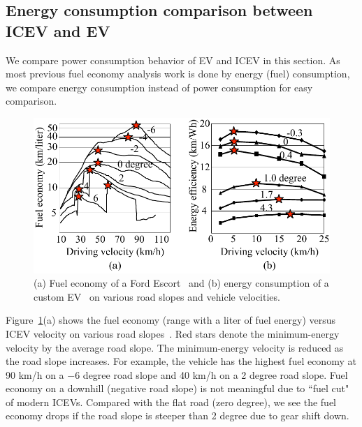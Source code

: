 \documentclass{IEEEtran}
\begin{document}
\subsection{Energy consumption comparison between ICEV and EV} \label{subsec:comparison}

We compare power consumption behavior of EV and ICEV in this section. As most previous fuel economy analysis work is done by energy (fuel) consumption, we compare energy consumption instead of power consumption for easy comparison. 

\begin{figure}	%
\includegraphics[width=1.0\hsize]{Figures/ICEV_EV_consumption.pdf}
\caption{(a) Fuel economy of a Ford Escort~\cite{Hooker:TR88} and (b) energy consumption of a custom EV~\cite{Chang:ICCAD14} on various road slopes and vehicle velocities.}
\label{fig:ICEV_EV_consumption}
\end{figure} 

Figure~\ref{fig:ICEV_EV_consumption}(a) shows the fuel economy (range with a liter of fuel energy) versus ICEV velocity on various road slopes~\cite{Hooker:TR88}. Red stars denote  the minimum-energy velocity by the average road slope. The minimum-energy velocity is reduced as the road slope increases. For example, the vehicle has the highest fuel economy at 90 km/h on  a $-6$ degree road slope and 40 km/h on a 2 degree road slope.  Fuel economy on a downhill (negative road slope) is not meaningful due to ``fuel cut" of modern ICEVs. Compared with the flat road (zero degree), we see the fuel economy drops if the road slope is steeper than 2 degree due to gear shift down.
\end{document}
